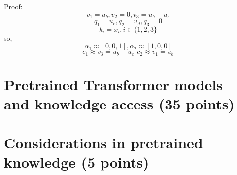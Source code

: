 \documentclass{homework}
\begin{document}
Proof:
$$
v_{1}=u_{b}, v_{2}=0, v_{3}=u_{b}-u_{c}
$$
$$
q_{1}=u_{c}, q_{2}=u_d, q_{3}=0
$$
$$
k_i=x_i, i\in \{1,2,3\}
$$
\quad so,
$$
\alpha_{1} \approx[0,0,1], \alpha_{2} \approx[1,0,0]
$$
$$
c_{1} \approx v_{3}=u_{b}-u_{c}, c_{2} \approx v_{1}=u_{b}
$$



\section{Pretrained Transformer models and knowledge access (35 points)}
\subsection{}


\section{Considerations in pretrained knowledge (5 points)}
\end{document}
